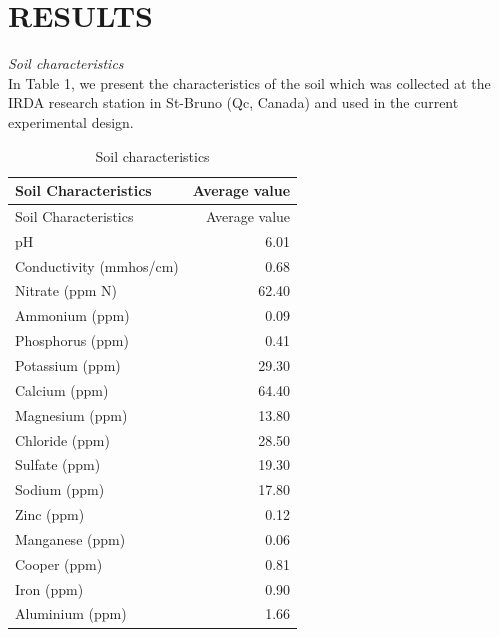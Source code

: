 \documentclass[11pt,]{article}
\begin{document}
\newpage  

\section{RESULTS}\label{results}

\emph{Soil characteristics}\\
In Table 1, we present the characteristics of the soil which was
collected at the IRDA research station in St-Bruno (Qc, Canada) and used
in the current experimental design.\\
\hspace*{0.333em}

\begin{longtable}[]{@{}lr@{}}
\caption{Soil characteristics}\tabularnewline
\toprule
Soil Characteristics & Average value\tabularnewline
\midrule
\endfirsthead
\toprule
Soil Characteristics & Average value\tabularnewline
\midrule
\endhead
pH & 6.01\tabularnewline
Conductivity (mmhos/cm) & 0.68\tabularnewline
Nitrate (ppm N) & 62.40\tabularnewline
Ammonium (ppm) & 0.09\tabularnewline
Phosphorus (ppm) & 0.41\tabularnewline
Potassium (ppm) & 29.30\tabularnewline
Calcium (ppm) & 64.40\tabularnewline
Magnesium (ppm) & 13.80\tabularnewline
Chloride (ppm) & 28.50\tabularnewline
Sulfate (ppm) & 19.30\tabularnewline
Sodium (ppm) & 17.80\tabularnewline
Zinc (ppm) & 0.12\tabularnewline
Manganese (ppm) & 0.06\tabularnewline
Cooper (ppm) & 0.81\tabularnewline
Iron (ppm) & 0.90\tabularnewline
Aluminium (ppm) & 1.66\tabularnewline
\bottomrule
\end{longtable}

~
\end{document}
